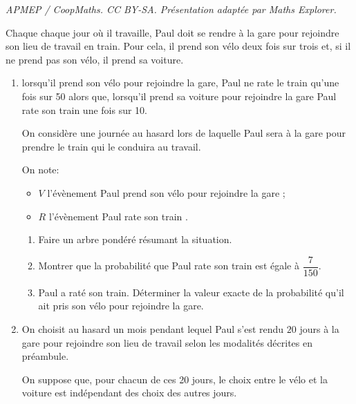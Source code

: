 \documentclass[10pt]{article}
\begin{document}
\noindent\textit{APMEP / CoopMaths. CC BY-SA. Présentation adaptée par Maths Explorer.}\par\medskip
\medskip

Chaque chaque jour où il travaille, Paul doit se rendre à la gare pour rejoindre son lieu de travail en train. Pour cela, il prend son vélo deux fois sur trois et, si il ne prend pas son vélo, il prend sa voiture.

\medskip

\begin{enumerate}
\item lorsqu'il prend son vélo pour rejoindre la gare, Paul ne rate le train qu'une fois sur 50 alors que, lorsqu'il prend sa voiture pour rejoindre la gare Paul rate son train une fois sur 10.

On considère une journée au hasard lors de laquelle Paul sera à la gare pour prendre le train qui le conduira au travail.

On note:

\setlength\parindent{8mm}
\begin{itemize}
\item[$\bullet~~$] $V$ l'évènement \og Paul prend son vélo pour rejoindre la gare \fg{} ; 
\item[$\bullet~~$] $R$ l'évènement \og Paul rate son train \fg.
\end{itemize}
\setlength\parindent{0mm}

	\begin{enumerate}
		\item Faire un arbre pondéré résumant la situation.
		\item Montrer que la probabilité que Paul rate son train est égale à $\dfrac{7}{150}$.
		\item Paul a raté son train. Déterminer la valeur exacte de la probabilité qu'il ait pris son vélo pour rejoindre la gare.
	\end{enumerate}
\item On choisit au hasard un mois pendant lequel Paul s'est rendu $20$ jours à la gare pour rejoindre son lieu de travail selon les modalités décrites en préambule. 

On suppose que, pour chacun de ces 20 jours, le choix entre le vélo et
la voiture est indépendant des choix des autres jours.


\end{enumerate}
\end{document}
